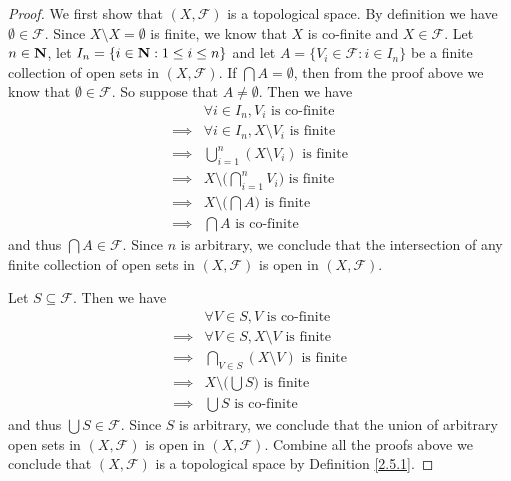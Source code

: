 \begin{proof}
    We first show that \((X, \mathcal{F})\) is a topological space.
    By definition we have \(\emptyset \in \mathcal{F}\).
    Since \(X \setminus X = \emptyset\) is finite, we know that \(X\) is co-finite and \(X \in \mathcal{F}\).
    Let \(n \in \mathbf{N}\), let \(I_n = \{i \in \mathbf{N} : 1 \leq i \leq n\}\) and let \(A = \{V_i \in \mathcal{F} : i \in I_n\}\) be a finite collection of open sets in \((X, \mathcal{F})\).
    If \(\bigcap A = \emptyset\), then from the proof above we know that \(\emptyset \in \mathcal{F}\).
    So suppose that \(A \neq \emptyset\).
    Then we have
    \begin{align*}
                 & \forall i \in I_n, V_i \text{ is co-finite}                     \\
        \implies & \forall i \in I_n, X \setminus V_i \text{ is finite}            \\
        \implies & \bigcup_{i = 1}^n (X \setminus V_i) \text{ is finite}           \\
        \implies & X \setminus \bigg(\bigcap_{i = 1}^n V_i\bigg) \text{ is finite} \\
        \implies & X \setminus \bigg(\bigcap A\bigg) \text{ is finite}             \\
        \implies & \bigcap A \text{ is co-finite}
    \end{align*}
    and thus \(\bigcap A \in \mathcal{F}\).
    Since \(n\) is arbitrary, we conclude that the intersection of any finite collection of open sets in \((X, \mathcal{F})\) is open in \((X, \mathcal{F})\).

    Let \(S \subseteq \mathcal{F}\).
    Then we have
    \begin{align*}
                 & \forall V \in S, V \text{ is co-finite}             \\
        \implies & \forall V \in S, X \setminus V \text{ is finite}    \\
        \implies & \bigcap_{V \in S} (X \setminus V) \text{ is finite} \\
        \implies & X \setminus \bigg(\bigcup S\bigg) \text{ is finite} \\
        \implies & \bigcup S \text{ is co-finite}
    \end{align*}
    and thus \(\bigcup S \in \mathcal{F}\).
    Since \(S\) is arbitrary, we conclude that the union of arbitrary open sets in \((X, \mathcal{F})\) is open in \((X, \mathcal{F})\).
    Combine all the proofs above we conclude that \((X, \mathcal{F})\) is a topological space by Definition \ref{2.5.1}.


\end{proof}
